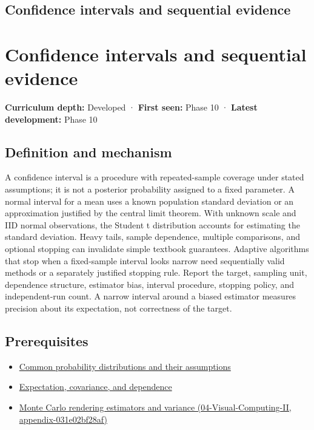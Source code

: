 \hypertarget{appendix-c83016554b1e}{}
\section*{Confidence intervals and sequential evidence}
\chapter{Confidence intervals and sequential evidence}\label{appendix-c83016554b1e-confidence-intervals-and-sequential-evidence}

\textbf{Curriculum depth:} Developed · \textbf{First seen:} Phase 10 · \textbf{Latest development:} Phase 10

\section{Definition and mechanism}\label{appendix-c83016554b1e-definition-and-mechanism}

A confidence interval is a procedure with repeated-sample coverage under stated assumptions; it is not a posterior probability assigned to a fixed parameter. A normal interval for a mean uses a known population standard deviation or an approximation justified by the central limit theorem. With unknown scale and IID normal observations, the Student t distribution accounts for estimating the standard deviation. Heavy tails, sample dependence, multiple comparisons, and optional stopping can invalidate simple textbook guarantees. Adaptive algorithms that stop when a fixed-sample interval looks narrow need sequentially valid methods or a separately justified stopping rule. Report the target, sampling unit, dependence structure, estimator bias, interval procedure, stopping policy, and independent-run count. A narrow interval around a biased estimator measures precision about its expectation, not correctness of the target.

\section{Prerequisites}\label{appendix-c83016554b1e-prerequisites}

\begin{itemize}
\tightlist
\item
  \hyperref[appendix-a2360b435383]{Common probability distributions and their assumptions}
\item
  \hyperref[appendix-54c383df9992]{Expectation, covariance, and dependence}
\item
  \href{../04-Visual-Computing-II/main.pdf\#nameddest=appendix-031e02bf28af}{Monte Carlo rendering estimators and variance (04-Visual-Computing-II, appendix-031e02bf28af)}
\end{itemize}


